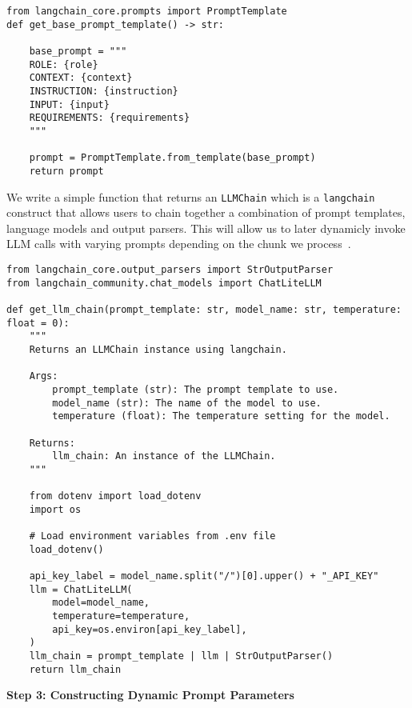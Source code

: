 \begin{verbatim}
from langchain_core.prompts import PromptTemplate
def get_base_prompt_template() -> str:
    
    base_prompt = """
    ROLE: {role}
    CONTEXT: {context}
    INSTRUCTION: {instruction}
    INPUT: {input}
    REQUIREMENTS: {requirements}
    """
    
    prompt = PromptTemplate.from_template(base_prompt)
    return prompt
\end{verbatim}

We write a simple function that returns an \texttt{LLMChain} which is a \texttt{langchain} construct that allows users to chain together a combination of prompt templates, language models and output parsers. This will allow us to later dynamicly invoke LLM calls with varying prompts depending on the chunk we process~.

\begin{verbatim}
from langchain_core.output_parsers import StrOutputParser
from langchain_community.chat_models import ChatLiteLLM

def get_llm_chain(prompt_template: str, model_name: str, temperature: float = 0):
    """
    Returns an LLMChain instance using langchain.

    Args:
        prompt_template (str): The prompt template to use.
        model_name (str): The name of the model to use.
        temperature (float): The temperature setting for the model.

    Returns:
        llm_chain: An instance of the LLMChain.
    """
    
    from dotenv import load_dotenv
    import os

    # Load environment variables from .env file
    load_dotenv()
    
    api_key_label = model_name.split("/")[0].upper() + "_API_KEY"
    llm = ChatLiteLLM(
        model=model_name,
        temperature=temperature,
        api_key=os.environ[api_key_label],
    )
    llm_chain = prompt_template | llm | StrOutputParser()
    return llm_chain
\end{verbatim}

\textbf{Step 3: Constructing Dynamic Prompt Parameters}

